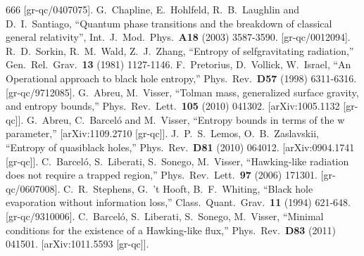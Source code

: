 \documentclass[12pt]{article}
\begin{document}
\begin{thebibliography}{666}
  [gr-qc/0407075].
G.~Chapline, E.~Hohlfeld, R.~B.~Laughlin and D.~I.~Santiago,
``Quantum phase transitions and the breakdown of classical general relativity'',
  Int.\ J.\ Mod.\ Phys.\  {\bf A18 } (2003)  3587-3590.
  [gr-qc/0012094].
  R.~D.~Sorkin, R.~M.~Wald, Z.~J.~Zhang,
  ``Entropy of selfgravitating radiation,''
  Gen.\ Rel.\ Grav.\  {\bf 13 } (1981)  1127-1146.
   F.~Pretorius, D.~Vollick, W.~Israel,
   ``An Operational approach to black hole entropy,''
   Phys.\ Rev.\  {\bf D57 } (1998)  6311-6316.
   [gr-qc/9712085].
  G.~Abreu, M.~Visser,
  ``Tolman mass, generalized surface gravity, and entropy bounds,''
  Phys.\ Rev.\ Lett.\  {\bf 105 } (2010)  041302.
  [arXiv:1005.1132 [gr-qc]].
  G.~Abreu, C.~Barcel\'o and M.~Visser,
  ``Entropy bounds in terms of the w parameter,''
  [arXiv:1109.2710 [gr-qc]].
  J.~P.~S.~Lemos, O.~B.~Zaslavskii,
  ``Entropy of quasiblack holes,''
  Phys.\ Rev.\  {\bf D81 } (2010)  064012.
  [arXiv:0904.1741 [gr-qc]].
  C.~Barcel\'o, S.~Liberati, S.~Sonego, M.~Visser,
  ``Hawking-like radiation does not require a trapped region,''
  Phys.\ Rev.\ Lett.\  {\bf 97 } (2006)  171301.
  [gr-qc/0607008].
  C.~R.~Stephens, G.~'t Hooft, B.~F.~Whiting,
  ``Black hole evaporation without information loss,''
  Class.\ Quant.\ Grav.\  {\bf 11 } (1994)  621-648.
  [gr-qc/9310006].
  C.~Barcel\'o, S.~Liberati, S.~Sonego, M.~Visser,
  ``Minimal conditions for the existence of a Hawking-like flux,''
  Phys.\ Rev.\  {\bf D83 } (2011)  041501.
  [arXiv:1011.5593 [gr-qc]].

\end{thebibliography}
\end{document}
